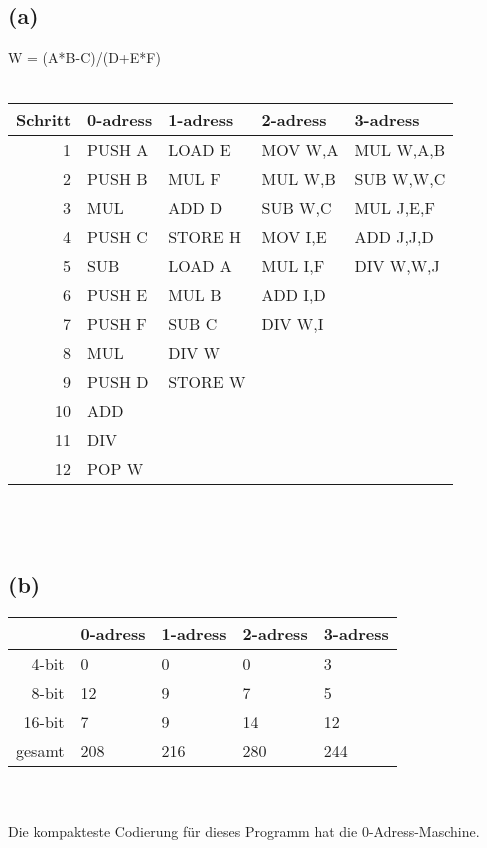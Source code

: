 \documentclass[12pt]{article}
\begin{document}
\subsection{(a)}
W = (A*B-C)/(D+E*F) \\\\
\begin{tabular} {r|l|l|l|l}
Schritt 	& 0-adress 	& 1-adress 	& 2-adress 	& 3-adress 		\\ \hline
1		& PUSH A 	& LOAD E 	& MOV W,A 	& MUL W,A,B 	\\
2		& PUSH B 	& MUL F 	& MUL W,B 	& SUB W,W,C 	\\
3		& MUL 	& ADD D 	& SUB W,C 	& MUL J,E,F 		\\
4		& PUSH C 	& STORE H	& MOV I,E 	& ADD J,J,D 		\\
5		& SUB 	& LOAD A 	& MUL I,F 	& DIV W,W,J 		\\
6		& PUSH E 	& MUL B	& ADD I,D 	& 		 	\\
7		& PUSH F 	& SUB C 	& DIV W,I 	&  			\\
8		& MUL 	& DIV W 	&  		&  			\\
9		& PUSH D 	& STORE W	&  		& 		 	\\
10		& ADD 	&  		&  		&  			\\
11		& DIV 		& 	 	&  		&  			\\
12		& POP W 	&		&  		& 
\end{tabular}
\\\\
\subsection{(b)}
\begin{tabular} {r|l|l|l|l}
		& 0-adress 	& 1-adress 	& 2-adress 	& 3-adress 	\\ \hline
4-bit		& 0		& 0		& 0		& 3		\\
8-bit 		& 12		& 9		& 7		& 5		\\
16-bit 		& 7		& 9		& 14		& 12		\\ \hline
gesamt	& 208		& 216		& 280		& 244		\\
\end{tabular}
\\\\
Die kompakteste Codierung für dieses Programm hat die 0-Adress-Maschine.
\end{document}
